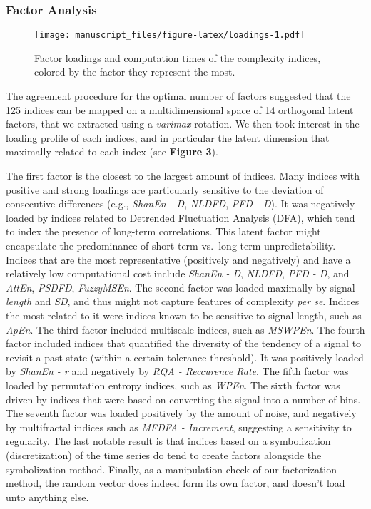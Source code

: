 \documentclass[
  man]{apa6}
\begin{document}
\hypertarget{factor-analysis}{%
\subsubsection{Factor Analysis}\label{factor-analysis}}

\begin{figure}
\centering
\texttt{[image: manuscript\_files/figure-latex/loadings-1.pdf]}
\caption{\label{fig:loadings}Factor loadings and computation times of the complexity indices, colored by the factor they represent the most.}
\end{figure}

The agreement procedure for the optimal number of factors suggested that the 125 indices can be mapped on a multidimensional space of 14 orthogonal latent factors, that we extracted using a \emph{varimax} rotation. We then took interest in the loading profile of each indices, and in particular the latent dimension that maximally related to each index (see \textbf{Figure 3}).

The first factor is the closest to the largest amount of indices. Many indices with positive and strong loadings are particularly sensitive to the deviation of consecutive differences (e.g., \emph{ShanEn - D}, \emph{NLDFD}, \emph{PFD - D}). It was negatively loaded by indices related to Detrended Fluctuation Analysis (DFA), which tend to index the presence of long-term correlations. This latent factor might encapsulate the predominance of short-term vs.~long-term unpredictability. Indices that are the most representative (positively and negatively) and have a relatively low computational cost include \emph{ShanEn - D}, \emph{NLDFD}, \emph{PFD - D}, and \emph{AttEn}, \emph{PSDFD}, \emph{FuzzyMSEn}. The second factor was loaded maximally by signal \emph{length} and \emph{SD}, and thus might not capture features of complexity \emph{per se}. Indices the most related to it were indices known to be sensitive to signal length, such as \emph{ApEn}. The third factor included multiscale indices, such as \emph{MSWPEn}. The fourth factor included indices that quantified the diversity of the tendency of a signal to revisit a past state (within a certain tolerance threshold). It was positively loaded by \emph{ShanEn - r} and negatively by \emph{RQA - Reccurence Rate}. The fifth factor was loaded by permutation entropy indices, such as \emph{WPEn}. The sixth factor was driven by indices that were based on converting the signal into a number of bins. The seventh factor was loaded positively by the amount of noise, and negatively by multifractal indices such as \emph{MFDFA - Increment}, suggesting a sensitivity to regularity. The last notable result is that indices based on a symbolization (discretization) of the time series do tend to create factors alongside the symbolization method. Finally, as a manipulation check of our factorization method, the random vector does indeed form its own factor, and doesn't load unto anything else.
\end{document}
